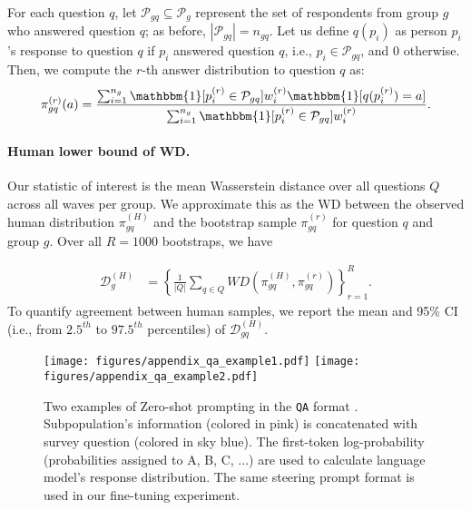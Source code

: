 \begin{itemize}[leftmargin=*]
    For each question $q$, let $\mathcal{P}_{gq} \subseteq \mathcal{P}_{g}$ represent the set of respondents from group $g$ who answered question $q$; as before, $|\mathcal{P}_{gq}| = n_{gq}$.
    Let us define $q(p_i)$ as person $p_i$'s response to question $q$ if $p_i$ answered question $q$, i.e., $p_i \in \mathcal{P}_{gq}$, and 0 otherwise.
    Then, we compute the $r$-th answer distribution to question $q$ as:
    \begin{align*}
        \pi_{gq}^{(r)}(a) = \frac{\sum_{i=1}^{n_{g}} \mathbbm{1}[p_i^{(r)} \in \mathcal{P}_{gq}] w_i^{(r)} \mathbbm{1}[q(p_i^{(r)}) = a]}{\sum_{i=1}^{n_{g}} \mathbbm{1}[p_i^{(r)} \in \mathcal{P}_{gq}] w_i^{(r)}}.
    \end{align*}


    \paragraph{Human lower bound of WD.}
    Our statistic of interest is the mean Wasserstein distance over all questions $Q$ across all waves per group. We approximate this as the WD between the observed human distribution $\pi_{gq}^{(H)}$ and the bootstrap sample $\pi_{gq}^{(r)}$ for question $q$ and group $g$.
    Over all $R=1000$ bootstraps, we have

\begin{align*}
    \mathcal{D}_{g}^{(H)} &= \left\{\frac{1}{|Q|}\sum_{q \in Q} WD(\pi_{gq}^{(H)}, \pi_{gq}^{(r)})\right\}_{r=1}^R.
\end{align*}
To quantify agreement between human samples, we report the mean and 95\% CI (i.e., from $2.5^{th}$ to $97.5^{th}$ percentiles) of $\mathcal{D}_{gq}^{(H)}$.
    
\end{itemize}

\begin{figure}[!t]
    \captionsetup{font=small}
    \texttt{[image: figures/appendix\_qa\_example1.pdf]}
    \texttt{[image: figures/appendix\_qa\_example2.pdf]}
    \caption{
    Two examples of Zero-shot prompting in the \texttt{QA} format \cite{santurkar2023whose}.
    Subpopulation's information (colored in pink) is concatenated with
    survey question (colored in sky blue).
    The first-token log-probability (probabilities assigned to A, B, C, ...)
    are used to calculate language model's response distribution.
    The same steering prompt format is used in our fine-tuning experiment.
    }
    \label{fig:baseline_qa_example}
\end{figure}

